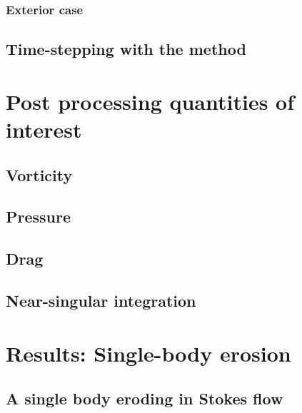 \documentclass[preprint, 10pt]{elsarticle}
\begin{document}
\subsubsection{Exterior case}

\subsection{Time-stepping with the {\thL} method} 
\label{sec:timeStepping}


\section{Post processing quantities of interest}
\label{s:qoi}

\subsection{Vorticity}
\subsection{Pressure}
\label{sec:pressure}

\subsection{Drag}
\label{sec:drag}

\subsection{Near-singular integration}
\label{sec:NSI}

\section{Results: Single-body erosion}
\label{s:SingleResults}

\subsection{A single body eroding in Stokes flow}
\end{document}

